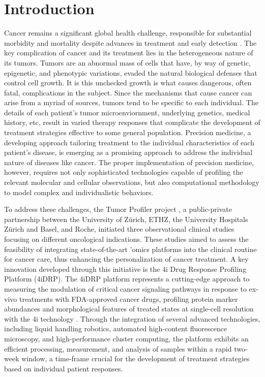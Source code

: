 
\section{Introduction}
Cancer remains a significant global health challenge, responsible for substantial morbidity and mortality despite advances in treatment and early detection \cite{miller2022}.
The key complication of cancer and its treatment lies in the heterogeneous nature of its tumors.
Tumors are an abnormal mass of cells that have, by way of genetic, epigenetic, and phenotypic variations, evaded the natural biological defenses that control cell growth.
It is this unchecked growth is what causes dangerous, often fatal, complications in the subject.
Since the mechanisms that cause cancer can arise from a myriad of sources, tumors tend to be specific to each individual.
The details of each patient's tumor microenviornment, underlying genetics, medical history, etc,
result in varied therapy responses that complicate the development of treatment strategies effective to some general population.
Precision medicine, a developing approach tailoring treatment to the individual characteristics of each patient's disease,
is emerging as a promising approach to address the individual nature of diseases like cancer.
The proper implementation of precision medicine, however, requires not only sophisticated technologies capable of profiling the relevant molecular and cellular observations,
but also computational methodology to model complex and individualistic behaviors.

To address these challenges, the Tumor Profiler project \cite{irmisch2021}, a public-private partnership between the University of Zürich, ETHZ, the University Hospitals Zürich and Basel, and Roche, initiated three observational clinical studies focusing on different oncological indications.
These studies aimed to assess the feasibility of integrating state-of-the-art 'omics platforms into the clinical routine for cancer care, thus enhancing the personalization of cancer treatment.
A key innovation developed through this initiative is the 4i Drug Response Profiling Platform (4iDRP).
The 4iDRP platform represents a cutting-edge approach to measuring the modulation of critical cancer signaling pathways in response to ex-vivo treatments with FDA-approved cancer drugs,
profiling protein marker abundances and morphological features of treated states at single-cell resolution with the 4i technology \cite{gut2018}.
Through the integration of several advanced technologies, including liquid handling robotics, automated high-content fluorescence microscopy, and high-performance cluster computing,
the platform exhibits an efficient processing, measurement, and analysis of samples within a rapid two-week window,
a time-frame crucial for the development of treatment strategies based on individual patient responses.

